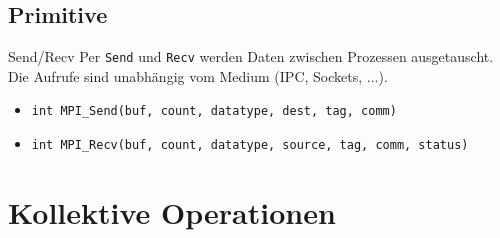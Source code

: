\documentclass{beamer}
\begin{document}
\subsection{Primitive}


\begin{frame}{Send/Recv}
	Per \texttt{Send} und \texttt{Recv} werden Daten zwischen Prozessen ausgetauscht.\\
	Die Aufrufe sind unabhängig vom Medium (IPC, Sockets, ...).

	\begin{figure}
	\end{figure}

	\begin{itemize}
		\item {\footnotesize \texttt{int MPI_Send(buf, count, datatype, dest, tag, comm)}}
		\item {\footnotesize \texttt{int MPI_Recv(buf, count, datatype, source, tag, comm, status)}}
	\end{itemize}
\end{frame}

\section{Kollektive Operationen}
\end{document}
